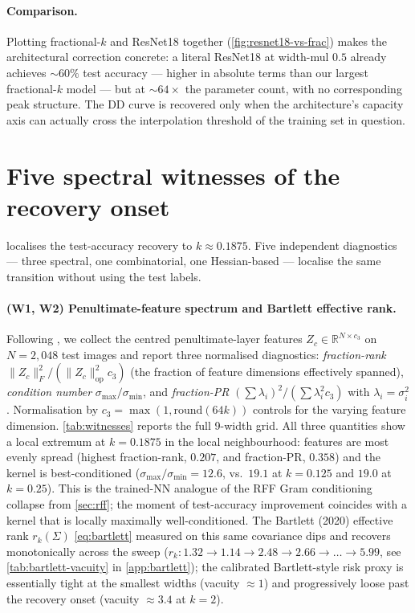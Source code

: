 \documentclass{article}
\begin{document}
\paragraph{Comparison.} Plotting fractional-$k$ and ResNet18 together (\cref{fig:resnet18-vs-frac}) makes the architectural correction concrete: a literal ResNet18 at width-mul $0.5$ already achieves $\sim$$60\%$ test accuracy --- higher in absolute terms than our largest fractional-$k$ model --- but at $\sim$$64\times$ the parameter count, with no corresponding peak structure. The DD curve is recovered only when the architecture's capacity axis can actually cross the interpolation threshold of the training set in question.

\section{Five spectral witnesses of the recovery onset}
\label{sec:spectral}

 localises the test-accuracy recovery to $k\!\approx\!0.1875$. Five independent diagnostics --- three spectral, one combinatorial, one Hessian-based --- localise the same transition without using the test labels.

\paragraph{(W1, W2) Penultimate-feature spectrum and Bartlett effective rank.} Following \citet{bartlett2020benign}, we collect the centred penultimate-layer features $Z_c\in\mathbb{R}^{N\times c_3}$ on $N=2{,}048$ test images and report three normalised diagnostics: \emph{fraction-rank} $\|Z_c\|_F^2/(\|Z_c\|_{\mathrm{op}}^2 c_3)$ (the fraction of feature dimensions effectively spanned), \emph{condition number} $\sigma_{\max}/\sigma_{\min}$, and \emph{fraction-PR} $(\sum\lambda_i)^2/(\sum\lambda_i^2 c_3)$ with $\lambda_i = \sigma_i^2$. Normalisation by $c_3 = \max(1, \mathrm{round}(64k))$ controls for the varying feature dimension. \cref{tab:witnesses} reports the full 9-width grid. All three quantities show a local extremum at $k\!=\!0.1875$ in the local neighbourhood: features are most evenly spread (highest fraction-rank, $0.207$, and fraction-PR, $0.358$) and the kernel is best-conditioned ($\sigma_{\max}/\sigma_{\min}\!=\!12.6$, vs.\ $19.1$ at $k\!=\!0.125$ and $19.0$ at $k\!=\!0.25$). This is the trained-NN analogue of the RFF Gram conditioning collapse from \cref{sec:rff}; the moment of test-accuracy improvement coincides with a kernel that is locally maximally well-conditioned. The Bartlett (2020) effective rank $r_k(\Sigma)$ \cref{eq:bartlett} measured on this same covariance dips and recovers monotonically across the sweep ($r_k\!:\!1.32\!\to\!1.14\!\to\!2.48\!\to\!2.66\!\to\!\ldots\!\to\!5.99$, see \cref{tab:bartlett-vacuity} in \cref{app:bartlett}); the calibrated Bartlett-style risk proxy is essentially tight at the smallest widths (vacuity $\approx 1$) and progressively loose past the recovery onset (vacuity $\approx 3.4$ at $k\!=\!2$).
\end{document}
